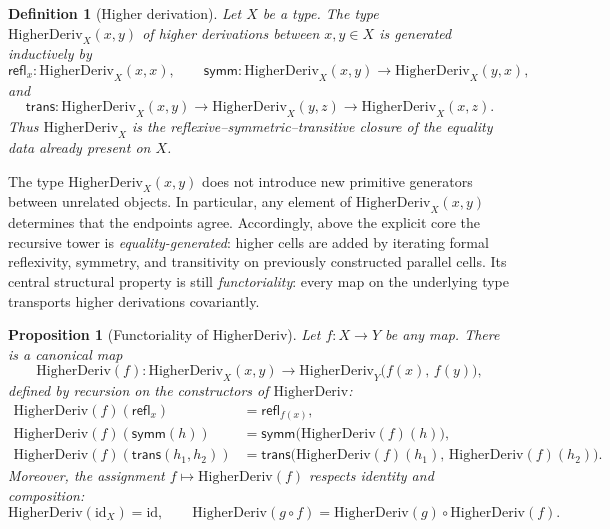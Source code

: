 \documentclass[webpdf,traditional,large,numbered]{oup-authoring-template}
\theoremstyle{thmstyleone}%
\newtheorem{proposition}[theorem]{Proposition}
\theoremstyle{thmstyletwo}%
\theoremstyle{thmstylethree}%
\newtheorem{definition}[theorem]{Definition}
\newcommand{\HigherDeriv}{\mathrm{HigherDeriv}}
\begin{document}
\begin{definition}[Higher derivation]\label{def:higherderiv}
Let $X$ be a type.  The type $\HigherDeriv_X(x,y)$ of \emph{higher
derivations} between $x,y\in X$ is generated inductively by
\[
\mathsf{refl}_x : \HigherDeriv_X(x,x),\qquad
\mathsf{symm} : \HigherDeriv_X(x,y)\to \HigherDeriv_X(y,x),
\]
and
\[
\mathsf{trans} : \HigherDeriv_X(x,y)\to \HigherDeriv_X(y,z)\to
\HigherDeriv_X(x,z).
\]
Thus $\HigherDeriv_X$ is the reflexive--symmetric--transitive closure of the
equality data already present on $X$.
\end{definition}

The type $\HigherDeriv_X(x,y)$ does not introduce new primitive generators
between unrelated objects.  In particular, any element of
$\HigherDeriv_X(x,y)$ determines that
the endpoints agree.  Accordingly, above the explicit core the recursive tower
is \emph{equality-generated}: higher cells are added by iterating formal
reflexivity, symmetry, and transitivity on previously constructed parallel
cells.  Its central structural property is still \emph{functoriality}: every
map on the underlying type transports higher derivations covariantly.

\begin{proposition}[Functoriality of $\HigherDeriv$]\label{prop:hd-functor}
  Let $f:X\to Y$ be any map.  There is a canonical map
  \[
    \HigherDeriv(f) : \HigherDeriv_X(x,y) \longrightarrow
    \HigherDeriv_Y\bigl(f(x),\,f(y)\bigr),
  \]
  defined by recursion on the constructors of\/ $\HigherDeriv$:
  \begin{align*}
    \HigherDeriv(f)(\mathsf{refl}_x)
      &= \mathsf{refl}_{f(x)},\\
    \HigherDeriv(f)(\mathsf{symm}(h))
      &= \mathsf{symm}\bigl(\HigherDeriv(f)(h)\bigr),\\
    \HigherDeriv(f)(\mathsf{trans}(h_1,h_2))
      &= \mathsf{trans}\bigl(\HigherDeriv(f)(h_1),\,
         \HigherDeriv(f)(h_2)\bigr).
  \end{align*}
  Moreover, the assignment $f\mapsto \HigherDeriv(f)$ respects identity and
  composition:
  \[
    \HigherDeriv(\mathrm{id}_X) = \mathrm{id},\qquad
    \HigherDeriv(g\circ f) = \HigherDeriv(g)\circ \HigherDeriv(f).
  \]
\end{proposition}
\end{document}
